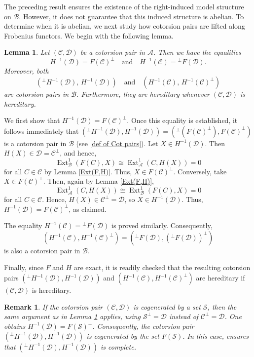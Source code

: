 \documentclass[12pt,twoside]{amsart}
\theoremstyle{bfupright head,slanted body}
\theoremstyle{bfupright head,upright body}
\theoremstyle{fixed bf head,slanted body}
\newtheorem{lem}[res]{Lemma}            \newtheorem*{lem*}{Lemma}
\theoremstyle{fixed bf head,upright body}
\newtheorem{rmk}[res]{Remark}           \newtheorem*{rmk*}{Remark}
\theoremstyle{numbered paragraph}
\newenvironment{prf*}[1][Proof]{%
  \begin{proof}[\bf #1]
    \setcounter{equation}{0}
    \renewcommand{\theequation}{\arabic{equation}}}
  {\end{proof}
}
\newcommand{\corcite}[2][?]{\cite[Corollary~#1]{#2}}
\numberwithin{equation}{res}
\newcommand{\calC}{\mathcal{C}}
\newcommand{\calA}{\mathcal{A}}
\newcommand{\calB}{\mathcal{B}}
\newcommand{\calD}{\mathcal{D}}
\newcommand{\calS}{\mathcal{S}}
\newcommand{\Ext}{\operatorname{Ext}}
\begin{document}
The preceding result ensures the existence of the right-induced model structure on \(\mathcal B\). However, it does not guarantee that this induced structure is abelian. To determine when it is abelian, we next study how cotorsion pairs are lifted along Frobenius functors. We begin with the following lemma.

\begin{lem}\label{cot pair (C,D)}
Let \((\calC,\calD)\) be a cotorsion pair in \(\calA\). Then we have the equalities
\[
H^{-1}(\calD)=F(\calC)^\perp
\quad\text{and}\quad
H^{-1}(\calC)={^\perp F(\calD)}.
\]
Moreover, both
\[
(^\perp H^{-1}(\calD),\, H^{-1}(\calD))
\quad\text{and}\quad
(H^{-1}(\calC),\, H^{-1}(\calC)^\perp)
\]
are cotorsion pairs in \(\calB\).
Furthermore, they are hereditary whenever \((\calC,\calD)\) is hereditary.
\end{lem}

\begin{prf*}
We first show that \(H^{-1}(\mathcal D)=F(\calC)^\bot\).
Once this equality is established, it follows immediately that
\(
(^\bot H^{-1}(\mathcal D), H^{-1}(\mathcal D)) =
({^\bot (F(\calC)^\bot)}, F(\calC)^\bot)
\)
is a cotorsion pair in \(\calB\) (see \ref{def of Cot pairs}).
Let \(X\in H^{-1}(\mathcal D)\). Then \(H(X)\in\calD=\calC^\bot\), and hence,
\[\Ext_{\calB}^1(F(C),X)\cong \Ext_{\calA}^1(C,H(X))=0\]
for all \(C\in\calC\) by Lemma \ref{Ext(F,H)}. Thus, \(X\in F(\calC)^\bot\). Conversely, take \(X\in F(\calC)^\bot\).
Then, again by Lemma \ref{Ext(F,H)},
\[\Ext_{\calA}^1(C,H(X))\cong \Ext_{\calB}^1(F(C),X)=0\]
for all \(C\in\calC\). Hence, \(H(X)\in\calC^\bot=\calD\), so \(X\in H^{-1}(\mathcal D)\).
Thus, \(H^{-1}(\mathcal D)=F(\calC)^\bot\), as claimed.

The equality \(H^{-1}(\mathcal C)={^\bot F(\calD)}\) is proved similarly.
Consequently,
\[
(H^{-1}(\mathcal C), H^{-1}(\mathcal C)^\bot) =
({^\bot F(\calD)}, ({^\bot F(\calD)})^\bot)
\]
is also a cotorsion pair in \(\calB\).

Finally, since \(F\) and \(H\) are exact, it is readily checked that the resulting cotorsion pairs
\((^\bot H^{-1}(\mathcal D), H^{-1}(\mathcal D))\) and
\((H^{-1}(\mathcal C), H^{-1}(\mathcal C)^\bot)\)
are hereditary if \((\calC,\calD)\) is hereditary.
\end{prf*}

\begin{rmk} \label{comolete for (C,C)}
If the cotorsion pair \((\calC,\calD)\) is cogenerated by a set \(\calS\), then the same argument as in Lemma \ref{cot pair (C,D)} applies, using \(\calS^\bot=\calD\) instead of \(\calC^\bot=\calD\). One obtains \(H^{-1}(\mathcal D)=F(\calS)^\bot\).
Consequently, the cotorsion pair \((^\bot H^{-1}(\mathcal D), H^{-1}(\mathcal D))\) is cogenerated by the set \(F(\calS)\). In this case, \corcite[2.15(3)]{2013Sto} ensures that \((^\bot H^{-1}(\mathcal D), H^{-1}(\mathcal D))\) is complete.
\end{rmk}
\end{document}
